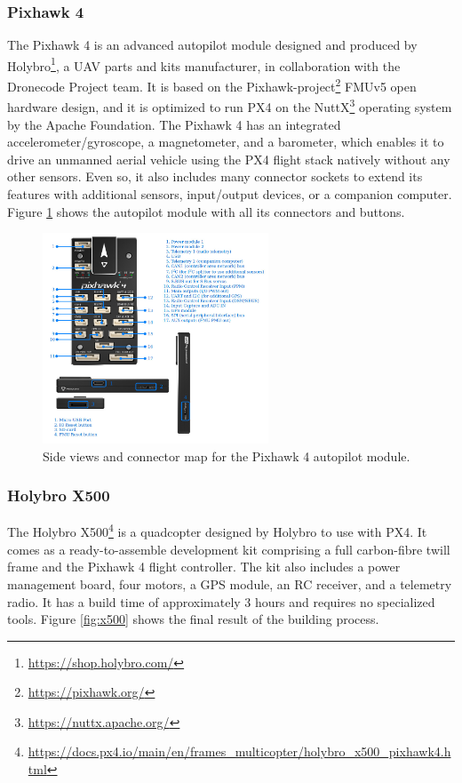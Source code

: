 \subsubsection{Pixhawk 4}
\label{subsec:pixhawk}
The Pixhawk 4 is an advanced autopilot module designed and produced by Holybro\footnote{\url{https://shop.holybro.com/}}, a UAV parts and kits manufacturer, in collaboration with the Dronecode Project team.
It is based on the Pixhawk-project\footnote{\url{https://pixhawk.org/}} FMUv5 open hardware design, and it is optimized to run PX4 on the NuttX\footnote{\url{https://nuttx.apache.org/}} operating system by the Apache Foundation.
The Pixhawk 4 has an integrated accelerometer/gyroscope, a magnetometer, and a barometer, which enables it to drive an unmanned aerial vehicle using the PX4 flight stack natively without any other sensors.
Even so, it also includes many connector sockets to extend its features with additional sensors, input/output devices, or a companion computer.
Figure \ref{fig:pixhawk4} shows the autopilot module with all its connectors and buttons.

\begin{figure}
  \centering
  \includegraphics[width=0.6\textwidth,keepaspectratio]{img/pixhawk4.jpg}
  \caption{Side views and connector map for the Pixhawk 4 autopilot module.}
  \label{fig:pixhawk4}
\end{figure}


\subsubsection{Holybro X500}
\label{subsec:x500}
The Holybro X500\footnote{\url{https://docs.px4.io/main/en/frames_multicopter/holybro_x500_pixhawk4.html}} is a quadcopter designed by Holybro to use with PX4.
It comes as a ready-to-assemble development kit comprising a full carbon-fibre twill frame and the Pixhawk 4 flight controller.
The kit also includes a power management board, four motors, a GPS module, an RC receiver, and a telemetry radio.
It has a build time of approximately 3 hours and requires no specialized tools.
Figure \ref{fig:x500} shows the final result of the building process.

